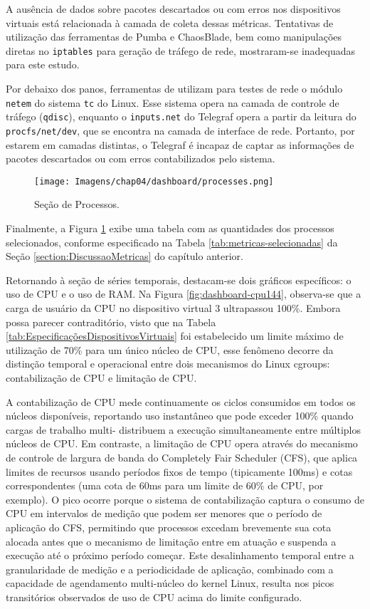 A ausência de dados sobre pacotes descartados ou com erros nos dispositivos virtuais está relacionada à camada de coleta dessas métricas. Tentativas de utilização das ferramentas de  Pumba e ChaosBlade, bem como manipulações diretas no \verb|iptables| para geração de tráfego de rede, mostraram-se inadequadas para este estudo.

Por debaixo dos panos, ferramentas de  utilizam para testes de rede o módulo \verb|netem| do sistema \verb|tc| do Linux. Esse sistema opera na camada de controle de tráfego (\verb|qdisc|), enquanto o  \verb|inputs.net| do Telegraf opera a partir da leitura do \verb|procfs/net/dev|, que se encontra na camada de interface de rede. Portanto, por estarem em camadas distintas, o Telegraf é incapaz de captar as informações de pacotes descartados ou com erros contabilizados pelo sistema.

\begin{figure}[H]
\centering
\setlength{\abovecaptionskip}{-20pt}
\texttt{[image: Imagens/chap04/dashboard/processes.png]}
\caption{Seção de Processos.}
\label{fig:dashboard-processes}
\end{figure}

Finalmente, a Figura \ref{fig:dashboard-processes} exibe uma tabela com as quantidades dos processos selecionados, conforme especificado na Tabela \ref{tab:metricas-selecionadas} da Seção \ref{section:DiscussaoMetricas} do capítulo anterior.

Retornando à seção de séries temporais, destacam-se dois gráficos específicos: o uso de CPU e o uso de RAM. Na Figura \ref{fig:dashboard-cpu144}, observa-se que a carga de usuário da CPU no dispositivo virtual 3 ultrapassou 100\%. Embora possa parecer contraditório, visto que na Tabela \ref{tab:EspecificaçõesDispositivosVirtuais} foi estabelecido um limite máximo de utilização de 70\% para um único núcleo de CPU, esse fenômeno decorre da distinção temporal e operacional entre dois mecanismos do Linux cgroups: contabilização de CPU e limitação de CPU.

A contabilização de CPU mede continuamente os ciclos consumidos em todos os núcleos disponíveis, reportando uso instantâneo que pode exceder 100\% quando cargas de trabalho multi- distribuem a execução simultaneamente entre múltiplos núcleos de CPU. Em contraste, a limitação de CPU opera através do mecanismo de controle de largura de banda do Completely Fair Scheduler (CFS), que aplica limites de recursos usando períodos fixos de tempo (tipicamente 100ms) e cotas correspondentes (uma cota de 60ms para um limite de 60\% de CPU, por exemplo). O pico ocorre porque o sistema de contabilização captura o consumo de CPU em intervalos de medição que podem ser menores que o período de aplicação do CFS, permitindo que processos excedam brevemente sua cota alocada antes que o mecanismo de limitação entre em atuação e suspenda a execução até o próximo período começar. Este desalinhamento temporal entre a granularidade de medição e a periodicidade de aplicação, combinado com a capacidade de agendamento multi-núcleo do kernel Linux, resulta nos picos transitórios observados de uso de CPU acima do limite configurado.

